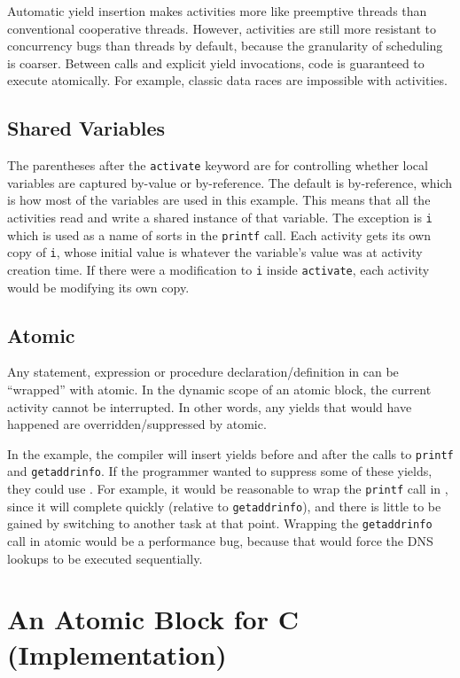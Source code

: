 \documentclass[acmsmall,anonymous,review]{acmart}\settopmatter{printfolios=true,printccs=false,printacmref=false}
\begin{document}
Automatic yield insertion makes activities more like preemptive threads than conventional cooperative threads.
However, activities are still more resistant to concurrency bugs than threads by default, because the granularity of scheduling is coarser.
Between calls and explicit yield invocations, code is guaranteed to execute atomically.
For example, classic data races are impossible with activities.


\subsection{Shared Variables}

The parentheses after the \texttt{activate} keyword are for controlling whether local variables are captured by-value or by-reference.
The default is by-reference, which is how most of the variables are used in this example.
This means that all the activities read and write a shared instance of that variable.
The exception is \texttt{i} which is used as a name of sorts in the \texttt{printf} call.
Each activity gets its own copy of \texttt{i}, whose initial value is whatever the variable's value was at activity creation time.
If there were a modification to \texttt{i} inside \texttt{activate}, each activity would be modifying its own copy.

\subsection{Atomic}
\label{sec:atomic}

Any statement, expression or procedure declaration/definition in \charcoal{} can be ``wrapped'' with atomic.
In the dynamic scope of an atomic block, the current activity cannot be interrupted.
In other words, any yields that would have happened are overridden/suppressed by atomic.

In the example, the compiler will insert yields before and after the calls to \texttt{printf} and \texttt{getaddrinfo}.
If the programmer wanted to suppress some of these yields, they could use \atomic{}.
For example, it would be reasonable to wrap the \texttt{printf} call in \atomic{}, since it will complete quickly (relative to \texttt{getaddrinfo}), and there is little to be gained by switching to another task at that point.
Wrapping the \texttt{getaddrinfo} call in atomic would be a performance bug, because that would force the DNS lookups to be executed sequentially.

\section{An Atomic Block for C (Implementation)}
\end{document}
